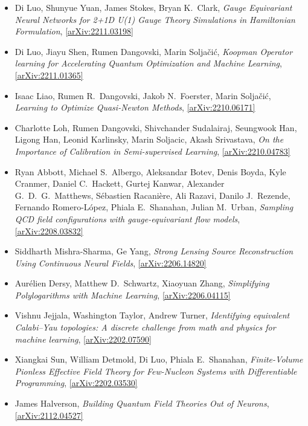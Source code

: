 \begin{itemize}
\item Di Luo, Shunyue Yuan, James Stokes, Bryan K.\  Clark, \textit{Gauge Equivariant Neural Networks for 2+1D U(1) Gauge Theory Simulations in Hamiltonian Formulation}, \href{https://arxiv.org/abs/2211.03198}{[arXiv:2211.03198]} 
\item Di Luo, Jiayu Shen, Rumen Dangovski, Marin Soljačić, \textit{Koopman Operator learning for Accelerating Quantum Optimization and Machine Learning}, \href{https://arxiv.org/abs/2211.01365}{[arXiv:2211.01365]} 
\item Isaac Liao, Rumen R.\  Dangovski, Jakob N.\  Foerster, Marin Soljačić, \textit{Learning to Optimize Quasi-Newton Methods}, \href{https://arxiv.org/abs/2210.06171}{[arXiv:2210.06171]} 
\item Charlotte Loh, Rumen Dangovski, Shivchander Sudalairaj, Seungwook Han, Ligong Han, Leonid Karlinsky, Marin Soljacic, Akash Srivastava, \textit{On the Importance of Calibration in Semi-supervised Learning}, \href{https://arxiv.org/abs/2210.04783}{[arXiv:2210.04783]} 
\item Ryan Abbott, Michael S.\  Albergo, Aleksandar Botev, Denis Boyda, Kyle Cranmer, Daniel C.\  Hackett, Gurtej Kanwar, Alexander G.\  D.\  G.\  Matthews, Sébastien Racanière, Ali Razavi, Danilo J.\  Rezende, Fernando Romero-López, Phiala E.\  Shanahan, Julian M.\  Urban, \textit{Sampling QCD field configurations with gauge-equivariant flow models}, \href{https://arxiv.org/abs/2208.03832}{[arXiv:2208.03832]} 
\item Siddharth Mishra-Sharma, Ge Yang, \textit{Strong Lensing Source Reconstruction Using Continuous Neural Fields}, \href{https://arxiv.org/abs/2206.14820}{[arXiv:2206.14820]} 
\item Aurélien Dersy, Matthew D.\  Schwartz, Xiaoyuan Zhang, \textit{Simplifying Polylogarithms with Machine Learning}, \href{https://arxiv.org/abs/2206.04115}{[arXiv:2206.04115]} 
\item Vishnu Jejjala, Washington Taylor, Andrew Turner, \textit{Identifying equivalent Calabi--Yau topologies: A discrete challenge from math and physics for machine learning}, \href{https://arxiv.org/abs/2202.07590}{[arXiv:2202.07590]} 
\item Xiangkai Sun, William Detmold, Di Luo, Phiala E.\  Shanahan, \textit{Finite-Volume Pionless Effective Field Theory for Few-Nucleon Systems with Differentiable Programming}, \href{https://arxiv.org/abs/2202.03530}{[arXiv:2202.03530]} 
\item James Halverson, \textit{Building Quantum Field Theories Out of Neurons}, \href{https://arxiv.org/abs/2112.04527}{[arXiv:2112.04527]} 

\end{itemize}
